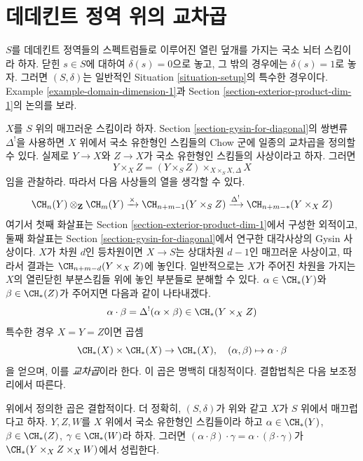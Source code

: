 \section{데데킨트 정역 위의 교차곱}
\label{section-intersection-product-dim-1}

\noindent
$S$를 데데킨트 정역들의 스펙트럼들로 이루어진 열린 덮개를 가지는
국소 뇌터 스킴이라 하자. 닫힌 $s \in S$에 대하여
$\delta(s) = 0$으로 놓고, 그 밖의 경우에는 $\delta(s) = 1$로 놓자.
그러면 $(S, \delta)$는 일반적인 Situation \ref{situation-setup}의
특수한 경우이다. Example \ref{example-domain-dimension-1}과 Section
\ref{section-exterior-product-dim-1}의 논의를 보라.

\medskip\noindent
$X$를 $S$ 위의 매끄러운 스킴이라 하자. Section
\ref{section-gysin-for-diagonal}의 쌍변류 $\Delta^!$을 사용하면
$X$ 위에서 국소 유한형인 스킴들의 Chow 군에 일종의 교차곱을 정의할
수 있다. 실제로 $Y \to X$와 $Z \to X$가 국소 유한형인 스킴들의
사상이라고 하자. 그러면
$$
Y \times_X Z =  (Y \times_S Z) \times_{X \times_S X, \Delta} X
$$
임을 관찰하라. 따라서 다음 사상들의 열을 생각할 수 있다.
$$
\CH_n(Y) \otimes_\mathbf{Z} \CH_m(Y)
\xrightarrow{\times}
\CH_{n + m - 1}(Y \times_S Z)
\xrightarrow{\Delta^!}
\CH_{n + m - *}(Y \times_X Z)
$$
여기서 첫째 화살표는 Section \ref{section-exterior-product-dim-1}에서
구성한 외적이고, 둘째 화살표는 Section
\ref{section-gysin-for-diagonal}에서 연구한 대각사상의 Gysin
사상이다. $X$가 차원 $d$인 등차원이면 $X \to S$는 상대차원
$d - 1$인 매끄러운 사상이고, 따라서 결과는
$\CH_{n + m - d}(Y \times_X Z)$에 놓인다. 일반적으로는 $X$가 주어진
차원을 가지는 $X$의 열린닫힌 부분스킴들 위에 놓인 부분들로 분해할
수 있다. $\alpha \in \CH_*(Y)$와 $\beta \in \CH_*(Z)$가 주어지면
다음과 같이 나타내겠다.
$$
\alpha \cdot \beta = \Delta^!(\alpha \times \beta)
\in \CH_*(Y \times_X Z)
$$
특수한 경우 $X = Y = Z$이면 곱셈
$$
\CH_*(X) \times \CH_*(X) \to \CH_*(X),\quad
(\alpha, \beta) \mapsto \alpha \cdot \beta
$$
을 얻으며, 이를 {\it 교차곱}이라 한다. 이 곱은 명백히 대칭적이다.
결합법칙은 다음 보조정리에서 따른다.

\begin{lemma}
\label{lemma-associative-dim-1}
위에서 정의한 곱은 결합적이다. 더 정확히, $(S, \delta)$가 위와 같고
$X$가 $S$ 위에서 매끄럽다고 하자. $Y, Z, W$를 $X$ 위에서 국소
유한형인 스킴들이라 하고
$\alpha \in \CH_*(Y)$, $\beta \in \CH_*(Z)$,
$\gamma \in \CH_*(W)$라 하자. 그러면
$(\alpha \cdot \beta) \cdot \gamma =
\alpha \cdot (\beta \cdot \gamma)$가
$\CH_*(Y \times_X Z \times_X W)$에서 성립한다.
\end{lemma}

